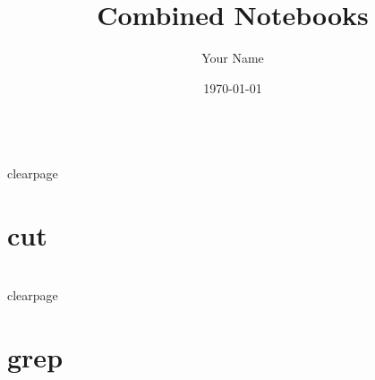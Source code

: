 \documentclass[12pt]{article}
\title{Combined Notebooks}
\author{Your Name}
\date{\today}
\begin{document}
\maketitle
\tableofcontents
\\clearpage
\section*{cut}

\\clearpage
\section*{grep}

\
\end{document}
